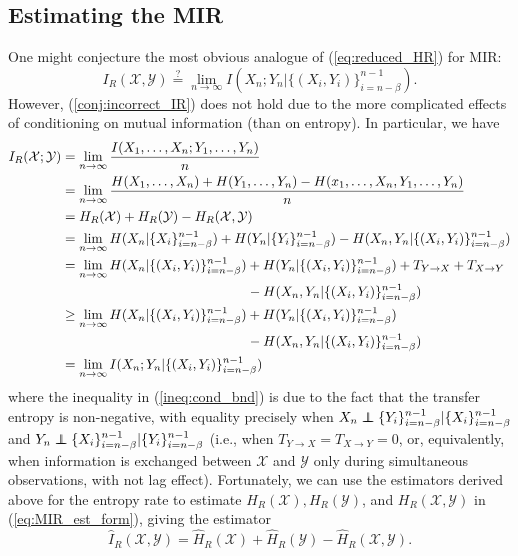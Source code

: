 \documentclass{article} %
\newcommand{\X}{\mathcal{X}}                        %
\newcommand{\Y}{\mathcal{Y}}                        %
\newcommand\ind{\protect\mathpalette{\protect\independenT}{\perp}}
\def\independenT#1#2{\mathrel{\rlap{$#1#2$}\mkern2mu{#1#2}}}
\begin{document}
\subsection{Estimating the MIR}
One might conjecture the most obvious analogue of (\ref{eq:reduced_HR}) for
MIR:
\begin{equation}
I_R(\X,\Y)
    \stackrel{?}{=}
    \lim_{n \to \infty} I(X_n; Y_n | \{(X_i,Y_i)\}_{i = n - \beta}^{n - 1}).
\label{conj:incorrect_IR}
\end{equation}
However, (\ref{conj:incorrect_IR}) does not hold due to the more complicated
effects of conditioning on mutual information (than on entropy). In particular,
we have
\begin{align}
I_R(\X;\Y)
 &  = \lim_{n \to \infty} \frac{I(X_1,\dots,X_n;Y_1,\dots,Y_n)}{n}          \\
 &  = \lim_{n \to \infty} \frac{H(X_1,\dots,X_n) + H(Y_1,\dots,Y_n)
                                    - H(x_1,\dots,X_n,Y_1,\dots,Y_n)}{n}    \\
\label{eq:MIR_est_form}
 &  = H_R(\X) + H_R(\Y) - H_R(\X,\Y)                                        \\
 &  = \lim_{n \to \infty} H(X_n | \{X_i\}_{i = n - \beta}^{n - 1})
                    + H(Y_n | \{Y_i\}_{i = n - \beta}^{n - 1})
                    - H(X_n,Y_n | \{(X_i,Y_i)\}_{i = n - \beta}^{n - 1})    \\
\notag
 &  = \lim_{n \to \infty} H(X_n | \{(X_i,Y_i)\}_{i = n - \beta}^{n - 1})
                        + H(Y_n | \{(X_i,Y_i)\}_{i = n - \beta}^{n - 1})
                        + T_{Y \to X} + T_{X \to Y}    \\
\label{ineq:tr_entropy}
 &      \hspace{48.5mm} - H(X_n,Y_n | \{(X_i,Y_i)\}_{i = n - \beta}^{n - 1}) \\
\notag
 &  \geq \lim_{n \to \infty} H(X_n | \{(X_i,Y_i)\}_{i = n - \beta}^{n - 1})
                    + H(Y_n | \{(X_i,Y_i)\}_{i = n - \beta}^{n - 1})    \\
\label{ineq:cond_bnd}
 &      \hspace{48.5mm} - H(X_n,Y_n | \{(X_i,Y_i)\}_{i = n - \beta}^{n - 1}) \\
 & = \lim_{n \to \infty} I(X_n; Y_n | \{(X_i,Y_i)\}_{i = n - \beta}^{n - 1})
\end{align}
where the inequality in (\ref{ineq:cond_bnd}) is due to the fact that the
transfer entropy is non-negative, with equality precisely when
$X_n \ind \{Y_i\}_{i = n - \beta}^{n - 1} | \{X_i\}_{i = n - \beta}^{n - 1}$
and
$Y_n \ind \{X_i\}_{i = n - \beta}^{n - 1} | \{Y_i\}_{i = n - \beta}^{n - 1}$
(i.e., when $T_{Y \to X} = T_{X \to Y} = 0$, or, equivalently, when information
is exchanged between $\X$ and $\Y$ only during simultaneous observations, with
not lag effect). Fortunately, we can use the estimators derived above for the
entropy rate to estimate $H_R(\X),H_R(\Y)$, and $H_R(\X,\Y)$ in
(\ref{eq:MIR_est_form}), giving the estimator
\[\hat I_R(\X,\Y) = \hat H_R(\X) + \hat H_R(\Y) - \hat H_R(\X,\Y).\]
\end{document}

